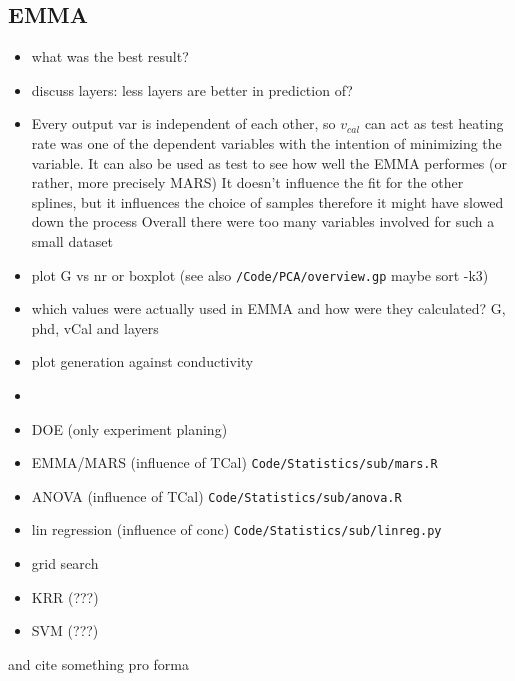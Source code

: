 \subsection{EMMA}
\begin{itemize}
    \item what was the best result? 
    \item discuss layers: less layers are better in prediction of? 
    \item Every output var is independent of each other, so $v_{cal}$ can act as test 
heating rate was one of the dependent variables with the intention of minimizing the variable. 
It can also be used as test to see how well the EMMA performes (or rather, more precisely MARS)
It doesn't influence the fit for the other splines, but it influences the choice of samples therefore it might have slowed down the process
Overall there were too many variables involved for such a small dataset
    \item plot G vs nr or boxplot (see also \texttt{/Code/PCA/overview.gp} maybe sort -k3) 
    \item which values were actually used in EMMA and how were they calculated?
        G, phd, vCal and layers
    \item plot generation against conductivity
    \item {}
    \item DOE (only experiment planing)
    \item EMMA/MARS (influence of TCal) \texttt{Code/Statistics/sub/mars.R}
    \item ANOVA (influence of TCal) \texttt{Code/Statistics/sub/anova.R}
    \item lin regression (influence of conc) \texttt{Code/Statistics/sub/linreg.py}
    \item grid search 
    \item KRR (???)
    \item SVM (???)
\end{itemize}

and cite something pro forma \cite{ncbi1butanol}
